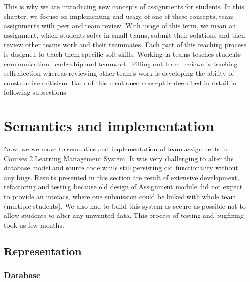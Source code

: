 This is why we are introducing new concepts of assignments for students.  In this chapter, we focuse on implementing and usage of one of these concepts, team assignments with peer and team review. With usage of this term, we mean an assignment, which students solve in small teams, submit their solutions and then review other teams work and their teammates. Each part of this teaching process is designed to teach them specific soft skills. Working in teams teaches students communication, leadership and teamwork. Filling out team reviews is teaching self\-reflection whereas reviewing other team's work is developing the ability of constructive critisism. Each of this mentioned concept is described in detail in following subsections.


\section{Semantics and implementation}
Now, we we move to semantics and implementation of team assignments in Courses 2 Learning Management System. It was very challenging to alter the database model and source code while still persisting old functionality without any bugs. Results presented in this section are result of extensive development, refactoring and testing because old design of Assignment module did not expect to provide an inteface, where one submission could be linked with whole team (multiple students). We also had to build this system as secure as possible not to allow students to alter any unwanted data. This process of testing and bugfixing took us few months.


\subsection{Representation}

\subsubsection{Database}


